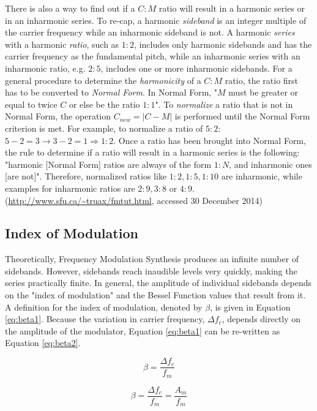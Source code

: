   \noindent There is also a way to find out if a $C:M$ ratio will result in a harmonic series or in an inharmonic series. To re-cap, a harmonic \emph{sideband} is an integer multiple of the carrier frequency while an inharmonic sideband is not. A harmonic \emph{series} with a harmonic \emph{ratio}, such as $1:2$, includes only harmonic sidebands and has the carrier frequency as the fundamental pitch, while an inharmonic series with an inharmonic ratio, e.g. $2:5$, includes one or more inharmonic sidebands. For a general procedure to determine the \emph{harmonicity} of a $C:M$ ratio, the ratio first has to be converted to \emph{Normal Form}. In Normal Form, "$M$ must be greater or equal to twice $C$ or else be the ratio $1:1$". To \emph{normalize} a ratio that is not in Normal Form, the operation $C_{new} = | C - M |$ is performed until the Normal Form criterion is met. For example, to normalize a ratio of $5:2$: $5 - 2 = 3 \rightarrow 3 - 2 = 1 \Rightarrow 1:2$. Once a ratio has been brought into Normal Form, the rule to determine if a ratio will result in a harmonic series is the following: "harmonic [Normal Form] ratios are always of the form $1:N$, and inharmonic ones [are not]". Therefore, normalized ratios like
  $1:2, 1:5, 1:10$ are inharmonic, while examples for inharmonic ratios are $2:9, 3:8 \text{ or } 4:9$.
  (\url{http://www.sfu.ca/~truax/fmtut.html}, accessed 30 December 2014)

  \subsection{Index of Modulation}

  Theoretically, Frequency Modulation Synthesis produces an infinite number of sidebands. However, sidebands reach inaudible levels very quickly, making the series practically finite. In general, the amplitude of individual sidebands depends on the "index of modulation" and the Bessel Function values that result from it. A definition for the index of modulation, denoted by $\beta$, is given in Equation \ref{eq:beta1}. Because the variation in carrier frequency, $\Delta f_{c}$, depends directly on the amplitude of the modulator, Equation \ref{eq:beta1} can be re-written as Equation \ref{eq:beta2}.

  \begin{multicols}{2}

    \begin{equation}
      \beta = \frac{\Delta f_{c}}{f_{m}}
      \label{eq:beta1}
    \end{equation}

    \begin{equation}
      \beta = \frac{\Delta f_{c}}{f_{m}} = \frac{A_{m}}{f_{m}}
      \label{eq:beta2}
    \end{equation}

  \end{multicols}


